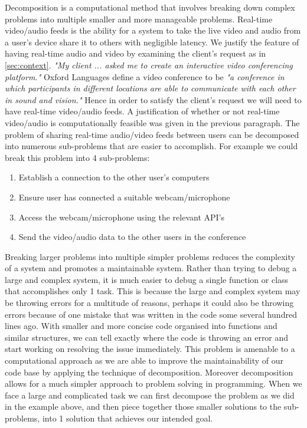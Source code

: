 Decomposition is a computational method that involves breaking
down complex problems into multiple smaller and more 
manageable problems. Real-time video/audio feeds is the ability
for a system to take the live video and audio from a user's 
device share it to others with negligible latency. We justify
the feature of having real-time audio and video by examining 
the client's request as in \ref{sec:context}. \textit{"My 
client ... asked me to create an interactive video conferencing
platform."} Oxford Languages define a video conference to be 
\textit{"a conference in which participants in different 
locations are able to communicate with each other in sound and
vision."} Hence in order to satisfy the client's request we 
will need to have real-time video/audio feeds. A justification
of whether or not real-time video/audio is computationally 
feasible was given in the previous paragraph.
The problem of sharing real-time audio/video feeds between
users can be decomposed into numerous sub-problems that are
easier to accomplish. For example we could break this problem
into 4 sub-problems:

\begin{enumerate}
  \item Establish a connection to the other user's computers 
  \item Ensure user has connected a suitable webcam/microphone
  \item Access the webcam/microphone using the relevant API's
  \item{Send the video/audio data to the other users in the 
        conference}
\end{enumerate}

Breaking larger problems into multiple simpler problems 
reduces the complexity of a system and promotes a  
maintainable system. Rather than trying to debug a large and
complex system, it is much easier to debug a single function 
or class
that accomplishes only 1 task. This is because the large and 
complex system may be throwing errors for a multitude of 
reasons, perhaps it could also be throwing errors because of
one mistake that was written in the code some several hundred
lines ago. With smaller and more concise code organised into
functions and similar structures, we can tell exactly where the
code is throwing an error and start working on resolving the 
issue immediately. This problem is amenable to a computational 
approach as we are able to improve the maintainability of our
code base by applying the technique of decomposition. Moreover
decomposition allows for a much simpler approach to problem 
solving in programming. When we face a large and complicated 
task we can first decompose the problem as we did in the 
example above, and then piece together those smaller solutions
to the sub-problems, into 1 solution that achieves our intended
goal. \vspace{0.2cm}

